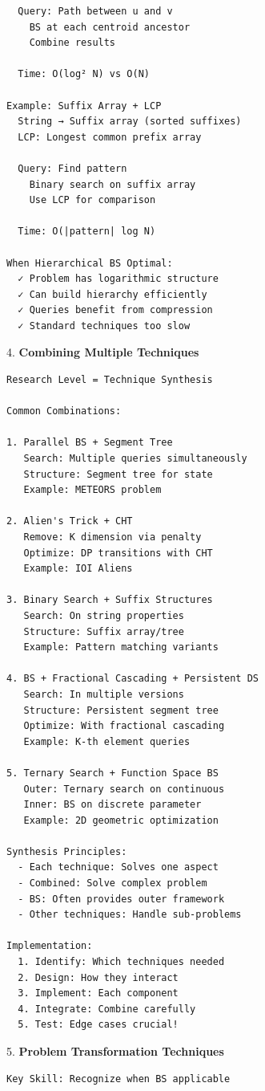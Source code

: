 \documentclass[11pt,a4paper,oneside]{book}
\begin{document}
\begin{tcolorbox}[
    enhanced,breakable,
    colback=white,
    colframe=deepblue,
    boxrule=1.5pt,
    arc=3mm,
    title=\textbf{Beyond Traditional Binary Search}
]
\begin{verbatim}
  Query: Path between u and v
    BS at each centroid ancestor
    Combine results
  
  Time: O(log² N) vs O(N)

Example: Suffix Array + LCP
  String → Suffix array (sorted suffixes)
  LCP: Longest common prefix array
  
  Query: Find pattern
    Binary search on suffix array
    Use LCP for comparison
  
  Time: O(|pattern| log N)

When Hierarchical BS Optimal:
  ✓ Problem has logarithmic structure
  ✓ Can build hierarchy efficiently
  ✓ Queries benefit from compression
  ✓ Standard techniques too slow
\end{verbatim}

4. \textbf{Combining Multiple Techniques}
\begin{verbatim}
Research Level = Technique Synthesis

Common Combinations:

1. Parallel BS + Segment Tree
   Search: Multiple queries simultaneously
   Structure: Segment tree for state
   Example: METEORS problem

2. Alien's Trick + CHT
   Remove: K dimension via penalty
   Optimize: DP transitions with CHT
   Example: IOI Aliens

3. Binary Search + Suffix Structures
   Search: On string properties
   Structure: Suffix array/tree
   Example: Pattern matching variants

4. BS + Fractional Cascading + Persistent DS
   Search: In multiple versions
   Structure: Persistent segment tree
   Optimize: With fractional cascading
   Example: K-th element queries

5. Ternary Search + Function Space BS
   Outer: Ternary search on continuous
   Inner: BS on discrete parameter
   Example: 2D geometric optimization

Synthesis Principles:
  - Each technique: Solves one aspect
  - Combined: Solve complex problem
  - BS: Often provides outer framework
  - Other techniques: Handle sub-problems

Implementation:
  1. Identify: Which techniques needed
  2. Design: How they interact
  3. Implement: Each component
  4. Integrate: Combine carefully
  5. Test: Edge cases crucial!
\end{verbatim}

5. \textbf{Problem Transformation Techniques}
\begin{verbatim}
Key Skill: Recognize when BS applicable


\end{verbatim}
\end{tcolorbox}
\end{document}
